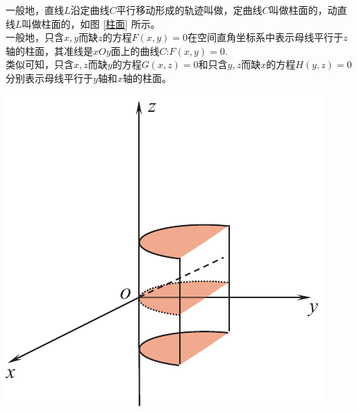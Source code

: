 \noindent
\begin{minipage}{0.65\linewidth}
\hspace*{2em}一般地，直线$L$沿定曲线$C$平行移动形成的轨迹叫做，定曲线$C$叫做柱面的，动直线$L$叫做柱面的，如图 \ref{柱面} 所示。\\
\hspace*{2em} 一般地，只含$x,y$而缺$z$的方程$F(x,y)=0$在空间直角坐标系中表示母线平行于$z$轴的柱面，其准线是$xOy$面上的曲线$C$:$F(x,y)=0$.\\
\hspace*{2em} 类似可知，只含$x,z$而缺$y$的方程$G(x,z)=0$和只含$y,z$而缺$x$的方程$H(y,z)=0$分别表示母线平行于$y$轴和$x$轴的柱面。
\end{minipage}
\begin{minipage}{0.35\linewidth}
	\centering
	\includegraphics[width = 0.85\linewidth]{pic/C-5/zhuti}
	\vspace*{-1em}
	\label{柱面}
\end{minipage}